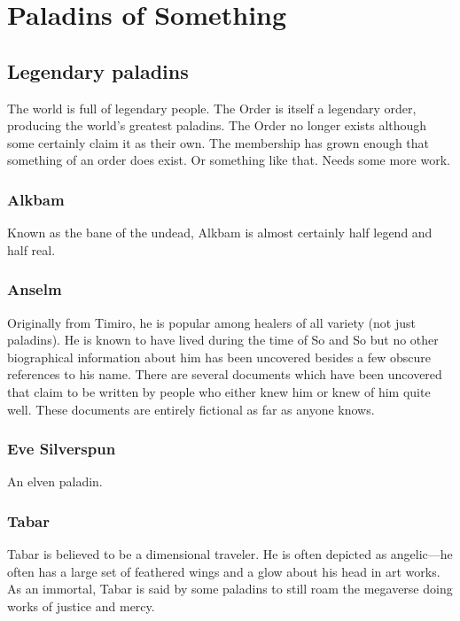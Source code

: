\chapter{Paladins of Something}

\section{Legendary paladins}\label{sec:legendary-paladins}

The world is full of legendary people.
The Order is itself a legendary order,
producing the world's greatest paladins.
The Order no longer exists although some
certainly claim it as their own.
The membership has grown enough that
something of an order does exist.
Or something like that.
Needs some more work.

\subsection{Alkbam}
Known as the bane of the undead,
Alkbam is almost certainly half legend
and half real.

\subsection{Anselm}
Originally from Timiro,
he is popular among healers of all variety
(not just paladins).
He is known to have lived during the time of So and So
but no other biographical information about him has been
uncovered besides a few obscure references to his name.
There are several documents which have been uncovered
that claim to be written by people who either knew him
or knew of him quite well.
These documents are entirely fictional as far as anyone
knows.

\subsection{Eve Silverspun}
An elven paladin.

\subsection{Tabar}
Tabar is believed to be a dimensional traveler.
He is often depicted as angelic---he often has
a large set of feathered wings and a glow about
his head in art works.
As an immortal, Tabar is said by some paladins
to still roam the megaverse doing works of
justice and mercy.
